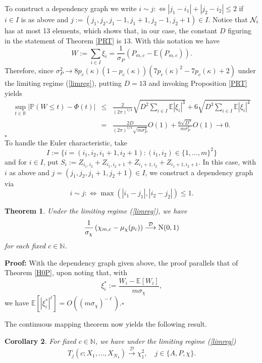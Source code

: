 \documentclass[12pt]{article}
\def\R{\mathbb{R}}
\def\N{\mathbb{N}}
\def\cd{\stackrel{\mathcal{D}}{\longrightarrow}}
\newtheorem{theorem}{\bf{Theorem}}[section]
\newtheorem{coro}[theorem]{Corollary}
\begin{document}
To construct a dependency graph we write $i \sim j  : \Longleftrightarrow  |j_1-i_1| + |j_2-i_2| \le 2$ if $i\in I$ is as above and $j :=(j_1,j_2,j_1-1,j_1+1,j_2-1,j_2+1) \in I$.
 Notice that ${\cal N}_i$ has at most 13 elements, which shows that, in our case, the constant $D$ figuring in the statement of Theorem \ref{PRT} is $13$.  With this notation we have
\begin{equation*}
W:=\sum_{i\in I} \xi_i=\frac{1}{\sigma_P}\left(P_{m,c}-\mathbb{E}(P_{m,c})\right).
\end{equation*}
Therefore, since $\sigma_P^2\rightarrow8p_c(\kappa)(1-p_c(\kappa))\left(7p_c(\kappa)^2-7p_c(\kappa)+2\right)$ under the limiting regime (\ref{limreg}), putting $D=13$ and invoking Proposition \ref{PRT} yields
\begin{eqnarray*}
\sup_{t \in \R}|\mathbb{P}(W \le t) - \Phi(t)| &\le& \frac{2}{(2 \pi)^{1/4}} \sqrt{ D^2 \sum_{i \in I} \mathbb{E} |\xi_i|^3} + 6 \sqrt{D^3  \sum_{i \in I} \mathbb{E} |\xi_i|^4}\\
&=&\frac{2D}{(2 \pi)^{1/4}\sqrt{m\sigma_P^3}}O(1)  + \frac{6\sqrt{D^3}}{m\sigma_P^2}O(1)\rightarrow0.
\end{eqnarray*}
\hfill$\square$\\[2mm]
To handle the Euler characteristic, take
$$
I := \{i = (i_1,i_2,i_1+1,i_{2}+1): (i_1,i_2) \in \{1,\ldots,m\}^2\}
$$
and for $i \in I$, put $S_i := Z_{i_1,i_2} + Z_{i_1,i_2+1} + Z_{i_1+1,i_2} + Z_{i_1+1,i_2+1}$.
In this case, with $i$ as above and $j =  (j_1,j_2,j_1+1,j_{2}+1) \in I$, we construct  a dependency graph via
$$
i \sim j : \Longleftrightarrow \max(|i_1-j_1|,|i_2-j_2|) \le 1.
$$
\begin{theorem}
Under the limiting regime (\ref{limreg}), we have
\begin{equation*}
\frac{1}{\sigma_\chi}\left(\chi_{m,c}-\mu_\chi(p_c)\right)\cd \mbox{\rm N}(0,1)
\end{equation*}
for each fixed $c\in\N$.
\end{theorem}
{\bf Proof:} With the dependency graph given above, the proof parallels that of Theorem \ref{H0P}, upon noting that, with
\begin{equation*}
\xi_i^*:=\frac{W_i-\mathbb{E}\left[W_i\right]}{m\sigma_\chi},
\end{equation*}
we have $\mathbb{E}\left[|\xi_i^*|^\ell\right] = O((m\sigma_\chi)^{-\ell})$.\hfill$\square$

The continuous mapping theorem now yields the following result.
\begin{coro}
For fixed $c\in\N$, we have under the limiting regime (\ref{limreg})
\begin{equation*}
    T_j(c;X_1,\ldots,X_{N_\lambda}) \cd \chi^2_1,\quad j\in\{A,P,\chi\}.
\end{equation*}
\end{coro}
\end{document}
